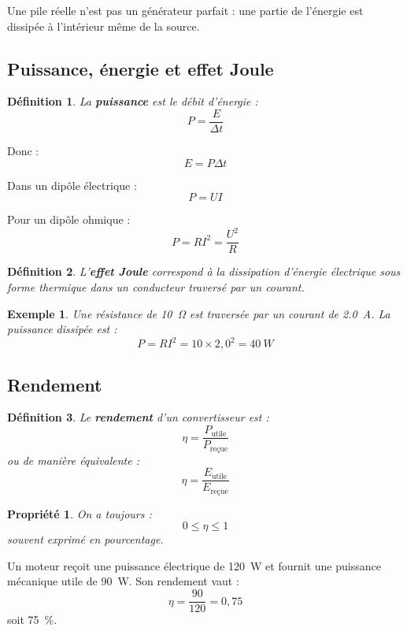 \documentclass[11pt,a4paper]{article}
\newtheorem{definition}{Définition}[section]
\newtheorem{propriete}{Propriété}[section]
\newtheorem{exemple}{Exemple}[section]
\begin{document}
\begin{attentionbox}
Une pile réelle n'est pas un générateur parfait : une partie de l'énergie est dissipée à l'intérieur même de la source.
\end{attentionbox}

\subsection{Puissance, énergie et effet Joule}

\begin{definition}
La \textbf{puissance} est le débit d'énergie :
\[
P=\frac{E}{\Delta t}
\]
\end{definition}

Donc :
\[
E=P\Delta t
\]

Dans un dipôle électrique :
\[
P=UI
\]

Pour un dipôle ohmique :
\[
P=RI^2=\frac{U^2}{R}
\]

\begin{definition}
L'\textbf{effet Joule} correspond à la dissipation d'énergie électrique sous forme thermique dans un conducteur traversé par un courant.
\end{definition}

\begin{exemple}
Une résistance de \SI{10}{\ohm} est traversée par un courant de \SI{2,0}{A}.  
La puissance dissipée est :
\[
P=RI^2=10\times 2,0^2=40\ \si{W}
\]
\end{exemple}

\subsection{Rendement}

\begin{definition}
Le \textbf{rendement} d'un convertisseur est :
\[
\eta = \frac{P_{\text{utile}}}{P_{\text{reçue}}}
\]
ou de manière équivalente :
\[
\eta=\frac{E_{\text{utile}}}{E_{\text{reçue}}}
\]
\end{definition}

\begin{propriete}
On a toujours :
\[
0\leq \eta \leq 1
\]
souvent exprimé en pourcentage.
\end{propriete}

\begin{applicationbox}
Un moteur reçoit une puissance électrique de \SI{120}{W} et fournit une puissance mécanique utile de \SI{90}{W}.  
Son rendement vaut :
\[
\eta=\frac{90}{120}=0,75
\]
soit \SI{75}{\percent}.
\end{applicationbox}
\end{document}
